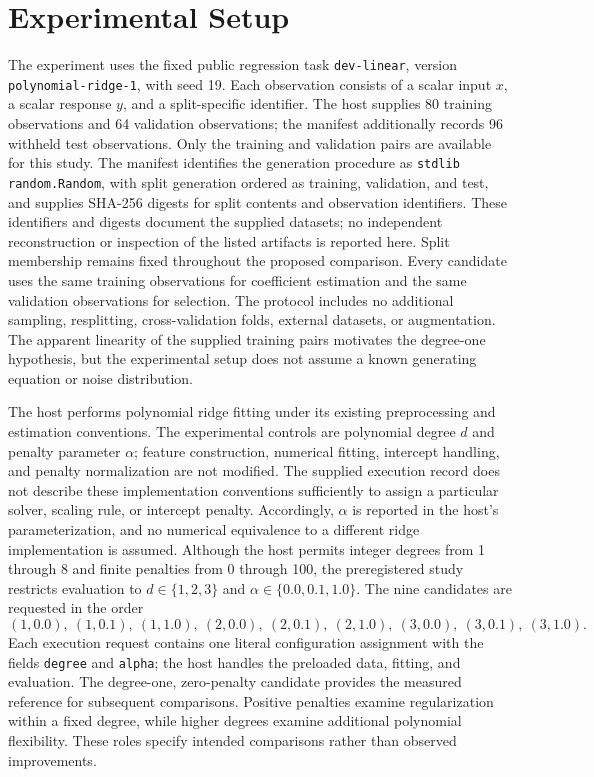 \documentclass[11pt]{article}
\begin{document}
\section{Experimental Setup}
The experiment uses the fixed public regression task \texttt{dev-linear}, version \texttt{polynomial-ridge-1}, with seed 19. Each observation consists of a scalar input \(x\), a scalar response \(y\), and a split-specific identifier. The host supplies 80 training observations and 64 validation observations; the manifest additionally records 96 withheld test observations. Only the training and validation pairs are available for this study. The manifest identifies the generation procedure as \texttt{stdlib random.Random}, with split generation ordered as training, validation, and test, and supplies SHA-256 digests for split contents and observation identifiers. These identifiers and digests document the supplied datasets; no independent reconstruction or inspection of the listed artifacts is reported here. Split membership remains fixed throughout the proposed comparison. Every candidate uses the same training observations for coefficient estimation and the same validation observations for selection. The protocol includes no additional sampling, resplitting, cross-validation folds, external datasets, or augmentation. The apparent linearity of the supplied training pairs motivates the degree-one hypothesis, but the experimental setup does not assume a known generating equation or noise distribution.

The host performs polynomial ridge fitting under its existing preprocessing and estimation conventions. The experimental controls are polynomial degree \(d\) and penalty parameter \(\alpha\); feature construction, numerical fitting, intercept handling, and penalty normalization are not modified. The supplied execution record does not describe these implementation conventions sufficiently to assign a particular solver, scaling rule, or intercept penalty. Accordingly, \(\alpha\) is reported in the host's parameterization, and no numerical equivalence to a different ridge implementation is assumed. Although the host permits integer degrees from 1 through 8 and finite penalties from 0 through 100, the preregistered study restricts evaluation to \(d\in\{1,2,3\}\) and \(\alpha\in\{0.0,0.1,1.0\}\). The nine candidates are requested in the order
\[
(1,0.0),\ (1,0.1),\ (1,1.0),\
(2,0.0),\ (2,0.1),\ (2,1.0),\
(3,0.0),\ (3,0.1),\ (3,1.0).
\]
Each execution request contains one literal configuration assignment with the fields \texttt{degree} and \texttt{alpha}; the host handles the preloaded data, fitting, and evaluation. The degree-one, zero-penalty candidate provides the measured reference for subsequent comparisons. Positive penalties examine regularization within a fixed degree, while higher degrees examine additional polynomial flexibility. These roles specify intended comparisons rather than observed improvements.
\end{document}
